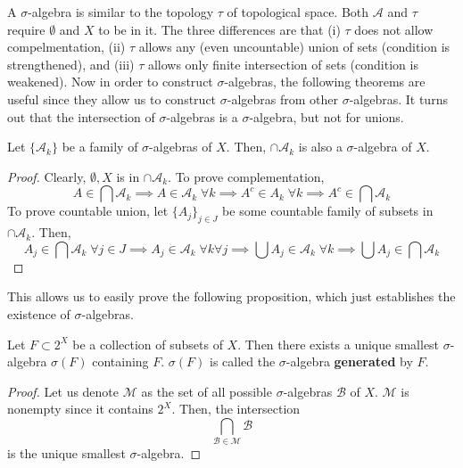   A $\sigma$-algebra is similar to the topology $\tau$ of topological space. Both $\mathcal{A}$ and $\tau$ require $\emptyset$ and $X$ to be in it. The three differences are that (i) $\tau$ does not allow compelmentation, (ii) $\tau$ allows any (even uncountable) union of sets (condition is strengthened), and (iii) $\tau$ allows only finite intersection of sets (condition is weakened). Now in order to construct $\sigma$-algebras, the following theorems are useful since they allow us to construct $\sigma$-algebras from other $\sigma$-algebras. It turns out that the intersection of $\sigma$-algebras is a $\sigma$-algebra, but not for unions. 

  \begin{theorem}
    Let $\{\mathcal{A}_k\}$ be a family of $\sigma$-algebras of $X$. Then, $\cap \mathcal{A}_k$ is also a $\sigma$-algebra of $X$. 
  \end{theorem}
  \begin{proof}
    Clearly, $\emptyset, X$ is in $\cap \mathcal{A}_k$. To prove complementation, 
    \begin{equation}
      A \in \bigcap \mathcal{A}_k \implies A \in \mathcal{A}_k \; \forall k \implies A^c \in A_k \; \forall k \implies A^c \in \bigcap \mathcal{A}_k
    \end{equation}
    To prove countable union, let $\{A_j\}_{j \in J}$ be some countable family of subsets in $\cap \mathcal{A}_k$. Then, 
    \begin{equation}
      A_j \in \bigcap \mathcal{A}_k \; \forall j \in J \implies A_j \in \mathcal{A}_k \; \forall k \forall j \implies \bigcup A_j \in \mathcal{A}_k \; \forall k \implies \bigcup A_j \in \bigcap \mathcal{A}_k
    \end{equation}
  \end{proof}

  This allows us to easily prove the following proposition, which just establishes the existence of $\sigma$-algebras. 

  \begin{proposition}
    Let $F \subset 2^X$ be a collection of subsets of $X$. Then there exists a unique smallest $\sigma$-algebra $\sigma(F)$ containing $F$. $\sigma(F)$ is called the $\sigma$-algebra \textbf{generated} by $F$. 
  \end{proposition}
  \begin{proof}
    Let us denote $\mathcal{M}$ as the set of all possible $\sigma$-algebras $\mathcal{B}$ of $X$. $\mathcal{M}$ is nonempty since it contains $2^X$. Then, the intersection 
    \begin{equation}
      \bigcap_{\mathcal{B} \in \mathcal{M}} \mathcal{B}
    \end{equation}
    is the unique smallest $\sigma$-algebra. 
  \end{proof}

